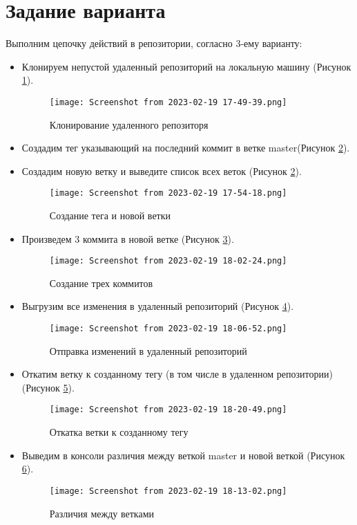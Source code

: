 \section{Задание варианта}
Выполним цепочку действий в репозитории, согласно 3-ему варианту:
\begin{itemize}
	\item Клонируем непустой удаленный репозиторий на локальную
		машину (Рисунок \ref{2:fig:git:clone}).
		\begin{figure}[h!tp]
			\centering
			\texttt{[image: Screenshot from 2023-02-19 17-49-39.png]}
			\caption{Клонирование удаленного репозиторя}
			\label{2:fig:git:clone}
		\end{figure}

	\item Создадим тег указывающий на последний коммит
		в ветке master(Рисунок \ref{2:fig:git:tag-branch}).
	\item Создадим новую ветку и выведите список
		всех веток (Рисунок \ref{2:fig:git:tag-branch}).
		\begin{figure}[h!tp]
			\centering
			\texttt{[image: Screenshot from 2023-02-19 17-54-18.png]}
			\caption{Создание тега и новой ветки}
			\label{2:fig:git:tag-branch}
		\end{figure}

	\item Произведем 3 коммита в новой ветке
		(Рисунок \ref{2:fig:git:three_commits}).
		\begin{figure}[h!tp]
			\centering
			\texttt{[image: Screenshot from 2023-02-19 18-02-24.png]}
			\caption{Создание трех коммитов}
			\label{2:fig:git:three_commits}
		\end{figure}

	\item Выгрузим все изменения в удаленный
		репозиторий (Рисунок \ref{2:fig:git:push}).
		\begin{figure}[h!tp]
			\centering
			\texttt{[image: Screenshot from 2023-02-19 18-06-52.png]}
			\caption{Отправка изменений в удаленный репозиторий}
			\label{2:fig:git:push}
		\end{figure}

	\item Откатим ветку к созданному тегу
		(в том числе в удаленном репозитории)
		(Рисунок \ref{2:fig:git:checkout}).
		\begin{figure}[h!tp]
			\centering
			\texttt{[image: Screenshot from 2023-02-19 18-20-49.png]}
			\caption{Откатка ветки к созданному тегу}
			\label{2:fig:git:checkout}
		\end{figure}

	\item Выведим в консоли различия между веткой master
		и новой веткой (Рисунок \ref{2:fig:git:diff}).
		\begin{figure}[h!tp]
			\centering
			\texttt{[image: Screenshot from 2023-02-19 18-13-02.png]}
			\caption{Различия между ветками}
			\label{2:fig:git:diff}
		\end{figure}
\end{itemize}
